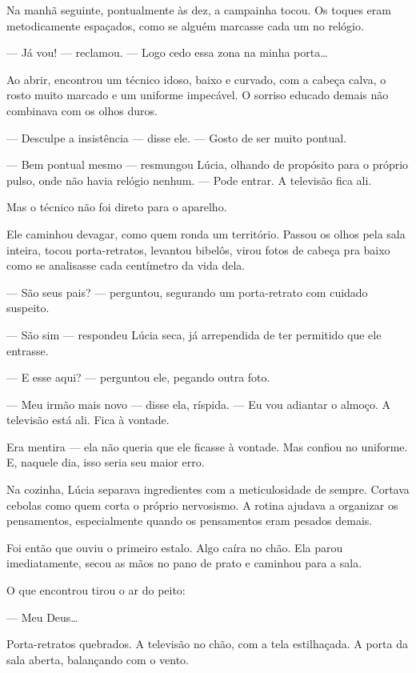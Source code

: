 \bigskip

Na manhã seguinte, pontualmente às dez, a campainha tocou. Os toques eram metodicamente espaçados, como se alguém marcasse cada um no relógio.

— Já vou! — reclamou. — Logo cedo essa zona na minha porta…

Ao abrir, encontrou um técnico idoso, baixo e curvado, com a cabeça calva, o rosto muito marcado e um uniforme impecável. O sorriso educado demais não combinava com os olhos duros.

— Desculpe a insistência — disse ele. — Gosto de ser muito pontual.

— Bem pontual mesmo — resmungou Lúcia, olhando de propósito para o próprio pulso, onde não havia relógio nenhum. — Pode entrar. A televisão fica ali.

Mas o técnico não foi direto para o aparelho.

Ele caminhou devagar, como quem ronda um território. Passou os olhos pela sala inteira, tocou porta-retratos, levantou bibelôs, virou fotos de cabeça pra baixo como se analisasse cada centímetro da vida dela.

— São seus pais? — perguntou, segurando um porta-retrato com cuidado suspeito.

— São sim — respondeu Lúcia seca, já arrependida de ter permitido que ele entrasse.

— E esse aqui? — perguntou ele, pegando outra foto.

— Meu irmão mais novo — disse ela, ríspida. — Eu vou adiantar o almoço. A televisão está ali. Fica à vontade.

Era mentira — ela não queria que ele ficasse à vontade.  
Mas confiou no uniforme.  
E, naquele dia, isso seria seu maior erro.

\bigskip

Na cozinha, Lúcia separava ingredientes com a meticulosidade de sempre. Cortava cebolas como quem corta o próprio nervosismo. A rotina ajudava a organizar os pensamentos, especialmente quando os pensamentos eram pesados demais.

Foi então que ouviu o primeiro estalo.  
Algo caíra no chão.  
Ela parou imediatamente, secou as mãos no pano de prato e caminhou para a sala.

O que encontrou tirou o ar do peito:

— Meu Deus…

Porta-retratos quebrados.  
A televisão no chão, com a tela estilhaçada.  
A porta da sala aberta, balançando com o vento.

